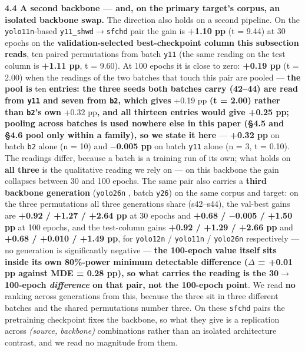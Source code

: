 \documentclass[pdflatex,sn-mathphys-ay]{sn-jnl}
\begin{document}
\textbf{4.4 A second backbone --- and, on the primary target's corpus, an isolated backbone swap.} The direction also holds on a second pipeline. On the \texttt{yolo11n}-based \citep{ultralyticsyolo11} \texttt{y11\_shwd\ensuremath{\rightarrow}sfchd} pair the gain is \textbf{+1.10 pp} (t = 9.44) at 30 epochs on the \textbf{validation-selected best-checkpoint column this subsection reads}, ten paired permutations from batch \texttt{y11} (the same reading on the test column is \textbf{+1.11 pp}, t = 9.60). At 100 epochs it is close to zero: \textbf{+0.19 pp} (t = 2.00) when the readings of the two batches that touch this pair are pooled --- \textbf{the pool is }ten\textbf{ entries: the three seeds both batches carry (42--44) are read from \texttt{y11} and seven from \texttt{b2}, which gives }+0.19 pp\textbf{ (t = 2.00) rather than \texttt{b2}'s own }+0.32 pp\textbf{, and all thirteen entries would give +0.25 pp; pooling across batches is used nowhere else in this paper (\S{}4.5 and \S{}4.6 pool only within a family), so we state it here} --- \textbf{+0.32 pp} on batch \texttt{b2} alone (n = 10) and \textbf{\ensuremath{-}0.005 pp} on batch \texttt{y11} alone (n = 3, \textbar{}t\textbar{} = 0.10). The readings differ, because a batch is a training run of its own; what holds on \textbf{all three} is the qualitative reading we rely on --- on this backbone the gain collapses between 30 and 100 epochs. The same pair also carries a \textbf{third backbone generation} (\texttt{yolo26n} \citep{jocher2026}, batch \texttt{y26}) on the same corpus and target: on the three permutations all three generations share (s42--s44), the val-best gains are \textbf{+0.92 / +1.27 / +2.64 pp} at 30 epochs and \textbf{+0.68 / \ensuremath{-}0.005 / +1.50 pp} at 100 epochs, and the test-column gains \textbf{+0.92 / +1.29 / +2.66 pp} and \textbf{+0.68 / +0.010 / +1.49 pp}, for \texttt{yolo12n} / \texttt{yolo11n} / \texttt{yolo26n} respectively --- no generation is significantly negative --- \textbf{the 100-epoch value itself sits inside its own 80\%-power minimum detectable difference (\textbar{}\ensuremath{\Delta}\textbar{} = +0.01 pp against MDE = 0.28 pp), so what carries the reading is the 30\ensuremath{\rightarrow}100-epoch \emph{difference} on that pair, not the 100-epoch point}. We read \textbf{no} ranking across generations from this, because the three sit in three different batches and the shared permutations number three. On these \texttt{sfchd} pairs the pretraining checkpoint fixes the backbone, so what they give is a replication across \emph{(source, backbone)} combinations rather than an isolated architecture contrast, and we read no magnitude from them.
\end{document}
